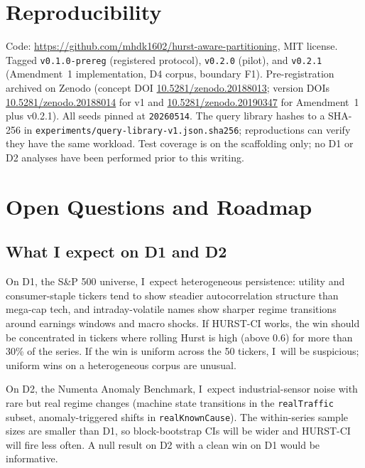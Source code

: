 \documentclass[11pt]{article}
\begin{document}
\section{Reproducibility}

Code: \url{https://github.com/mhdk1602/hurst-aware-partitioning}, MIT license. Tagged \texttt{v0.1.0-prereg} (registered protocol), \texttt{v0.2.0} (pilot), and \texttt{v0.2.1} (Amendment~1 implementation, D4 corpus, boundary F1). Pre-registration archived on Zenodo (concept DOI \href{https://doi.org/10.5281/zenodo.20188013}{10.5281/zenodo.20188013}; version DOIs \href{https://doi.org/10.5281/zenodo.20188014}{10.5281/zenodo.20188014} for v1 and \href{https://doi.org/10.5281/zenodo.20190347}{10.5281/zenodo.20190347} for Amendment~1 plus v0.2.1). All seeds pinned at \texttt{20260514}. The query library hashes to a SHA-256 in \texttt{experiments/query-library-v1.json.sha256}; reproductions can verify they have the same workload. Test coverage is on the scaffolding only; no D1 or D2 analyses have been performed prior to this writing.

\section{Open Questions and Roadmap}

\subsection{What I expect on D1 and D2}

On D1, the S\&P 500 universe, I~expect heterogeneous persistence: utility and consumer-staple tickers tend to show steadier autocorrelation structure than mega-cap tech, and intraday-volatile names show sharper regime transitions around earnings windows and macro shocks. If HURST-CI works, the win should be concentrated in tickers where rolling Hurst is high (above 0.6) for more than 30\% of the series. If the win is uniform across the 50 tickers, I~will be suspicious; uniform wins on a heterogeneous corpus are unusual.

On D2, the Numenta Anomaly Benchmark, I~expect industrial-sensor noise with rare but real regime changes (machine state transitions in the \texttt{realTraffic} subset, anomaly-triggered shifts in \texttt{realKnownCause}). The within-series sample sizes are smaller than D1, so block-bootstrap CIs will be wider and HURST-CI will fire less often. A null result on D2 with a clean win on D1 would be informative.
\end{document}

